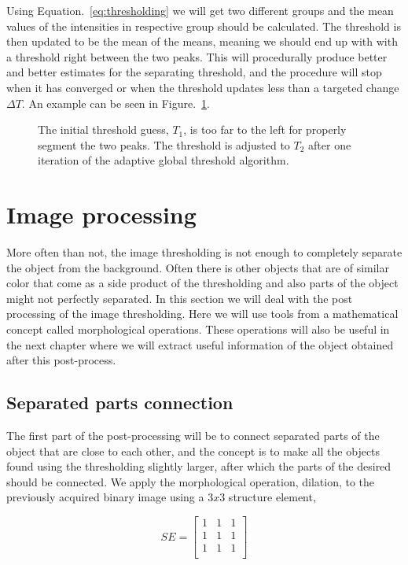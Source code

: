 Using Equation.~\eqref{eq:thresholding} we will get two different groups and the mean values of the intensities in respective group should be calculated. The threshold is then updated to be the mean of the means, meaning we should end up with with a threshold right between the two peaks. This will procedurally produce better and better estimates for the separating threshold, and the procedure will stop when it has converged or when the threshold updates less than a targeted change $\Delta T$. An example can be seen in Figure.~\ref{fig:adaptiveThreshold}.

\begin{figure}
    \centering
    
    \caption{\label{fig:adaptiveThreshold}The initial threshold guess, $T_1$, is too far to the left for properly segment the two peaks. The threshold is adjusted to $T_2$ after one iteration of the adaptive global threshold algorithm.}
\end{figure}

\section{Image processing}

More often than not, the image thresholding is not enough to completely separate the object from the background. Often there is other objects that are of similar color that come as a side product of the thresholding and also parts of the object might not perfectly separated. In this section we will deal with the post processing of the image thresholding. Here we will use tools from a mathematical concept called morphological operations. These operations will also be useful in the next chapter where we will extract useful information of the object obtained after this post-process.

\subsection{Separated parts connection}

The first part of the post-processing will be to connect separated parts of the object that are close to each other, and the concept is to make all the objects found using the thresholding slightly larger, after which the parts of the desired should be connected. We apply the morphological operation, dilation, to the previously acquired binary image using a $3x3$ structure element,

\begin{equation}
    SE=\left[
        \begin{array}{ccc}
        1 & 1 & 1 \\
        1 & 1 & 1 \\
        1 & 1 & 1 \\
        \end{array}
    \right]
    \label{eq:se}
\end{equation}

